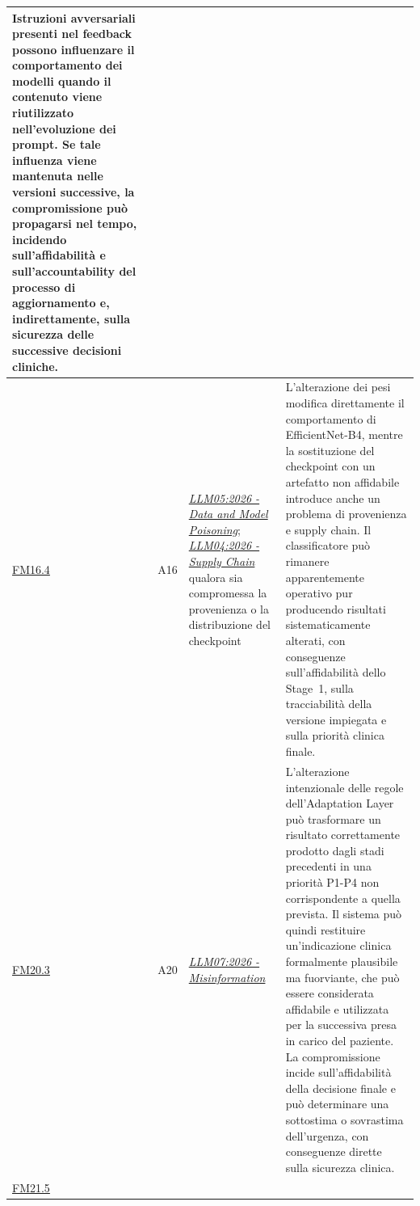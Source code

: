 {\begin{xltabular}{\textwidth}{
    >{\raggedright\arraybackslash}p{1.1cm}
    >{\raggedright\arraybackslash}p{1.1cm}
    >{\raggedright\arraybackslash}p{4.3cm}
    X
}
Istruzioni avversariali presenti nel feedback possono influenzare il
comportamento dei modelli quando il contenuto viene riutilizzato
nell'evoluzione dei prompt. Se tale influenza viene mantenuta nelle
versioni successive, la compromissione può propagarsi nel tempo,
incidendo sull'affidabilità e sull'accountability del processo di
aggiornamento e, indirettamente, sulla sicurezza delle successive
decisioni cliniche. \\

\midrule


\hyperlink{fm16-4}{FM16.4} &

A16 &

\href{https://genai.owasp.org/resource/owasp-genai-llm-top-10-2026/}
{\textit{LLM05:2026 - Data and Model Poisoning}};
\href{https://genai.owasp.org/resource/owasp-genai-llm-top-10-2026/}
{\textit{LLM04:2026 - Supply Chain}}
qualora sia compromessa la provenienza o la distribuzione del checkpoint &

L'alterazione dei pesi modifica direttamente il comportamento di
EfficientNet-B4, mentre la sostituzione del checkpoint con un artefatto
non affidabile introduce anche un problema di provenienza e supply chain.
Il classificatore può rimanere apparentemente operativo pur producendo
risultati sistematicamente alterati, con conseguenze sull'affidabilità
dello Stage~1, sulla tracciabilità della versione impiegata e sulla
priorità clinica finale. \\

\midrule


\hyperlink{fm20-3}{FM20.3} &

A20 &

\href{https://genai.owasp.org/resource/owasp-genai-llm-top-10-2026/}
{\textit{LLM07:2026 - Misinformation}} &

L'alterazione intenzionale delle regole dell'Adaptation Layer può
trasformare un risultato correttamente prodotto dagli stadi precedenti
in una priorità P1-P4 non corrispondente a quella prevista. Il sistema
può quindi restituire un'indicazione clinica formalmente plausibile ma
fuorviante, che può essere considerata affidabile e utilizzata per la
successiva presa in carico del paziente. La compromissione incide
sull'affidabilità della decisione finale e può determinare una
sottostima o sovrastima dell'urgenza, con conseguenze dirette sulla
sicurezza clinica. \\

\midrule


\hyperlink{fm21-5}{FM21.5} &


\end{xltabular}}
